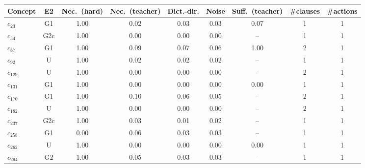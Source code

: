 \begin{tabular}{lcccccccc}
\toprule
Concept & E2 & Nec.\ (hard) & Nec.\ (teacher) & Dict.-dir. & Noise & Suff.\ (teacher) & \#clauses & \#actions \\
\midrule
$c_{23}$ & G1 & 1.00 & 0.02 & 0.03 & 0.03 & 0.07 & 1 & 1 \\
$c_{54}$ & G2c & 1.00 & 0.00 & 0.00 & 0.00 & -- & 1 & 1 \\
$c_{87}$ & G1 & 1.00 & 0.09 & 0.07 & 0.06 & 1.00 & 2 & 1 \\
$c_{92}$ & U & 1.00 & 0.02 & 0.02 & 0.02 & -- & 1 & 1 \\
$c_{129}$ & U & 1.00 & 0.00 & 0.00 & 0.00 & -- & 2 & 1 \\
$c_{131}$ & G1 & 1.00 & 0.00 & 0.00 & 0.00 & 0.00 & 1 & 1 \\
$c_{170}$ & G1 & 1.00 & 0.10 & 0.06 & 0.05 & -- & 2 & 1 \\
$c_{182}$ & U & 1.00 & 0.00 & 0.00 & 0.00 & -- & 2 & 1 \\
$c_{237}$ & G2c & 1.00 & 0.03 & 0.01 & 0.02 & -- & 1 & 1 \\
$c_{258}$ & G1 & 0.00 & 0.06 & 0.03 & 0.03 & -- & 1 & 1 \\
$c_{262}$ & U & 1.00 & 0.00 & 0.00 & 0.00 & 0.00 & 1 & 1 \\
$c_{294}$ & G2 & 1.00 & 0.05 & 0.03 & 0.03 & -- & 1 & 1 \\
\bottomrule
\end{tabular}